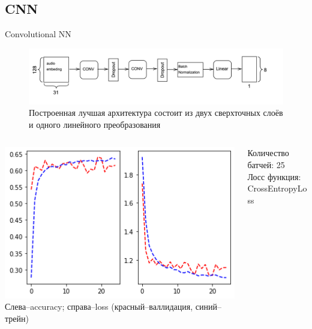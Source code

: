 \documentclass[c, aspectratio = 43]{beamer}
\begin{document}
\subsection{CNN}

    \begin{frame}{Convolutional NN}
        \begin{figure}[h]
            \includegraphics[width=1\linewidth]{CNN.png}
            Построенная лучшая архитектура состоит из двух сверхточных слоёв и одного линейного преобразования
        \end{figure}

        \begin{columns}
            \begin{column}{0.5\textwidth}  %
                \begin{center}
                    \includegraphics[width=1\textwidth]{CNN_testandval.png}
                    \tiny Слева--accuracy; справа--loss (красный--валлидация, синий--трейн)
                \end{center}
            \end{column}
            \begin{column}{0.5\textwidth}
                Количество батчей: 25\\
                Лосс функция: CrossEntropyLoss\\


\end{column}
\end{columns}
\end{frame}
\end{document}
